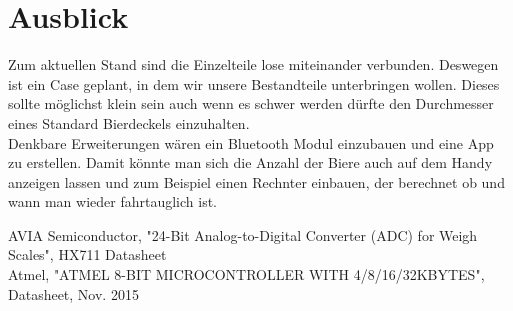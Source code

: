 \documentclass[12pt,journal,compsoc]{IEEEtran}
\begin{document}
\section{Ausblick}

Zum aktuellen Stand sind die Einzelteile lose miteinander verbunden. Deswegen ist ein Case
geplant, in dem wir unsere Bestandteile unterbringen wollen. Dieses sollte möglichst klein sein
auch wenn es schwer werden dürfte den Durchmesser eines Standard Bierdeckels einzuhalten.\\
Denkbare Erweiterungen wären ein Bluetooth Modul einzubauen und eine App zu erstellen.
Damit könnte man sich die Anzahl der Biere auch auf dem Handy anzeigen lassen und zum Beispiel
einen Rechnter einbauen, der berechnet ob und wann man wieder fahrtauglich ist.



%
%
%


\begin{thebibliography}{1}

AVIA Semiconductor, "24-Bit Analog-to-Digital Converter (ADC) for Weigh Scales", HX711 Datasheet
\\
Atmel, "ATMEL 8-BIT MICROCONTROLLER WITH 4/8/16/32KBYTES", Datasheet, Nov. 2015

\end{thebibliography}
\end{document}
